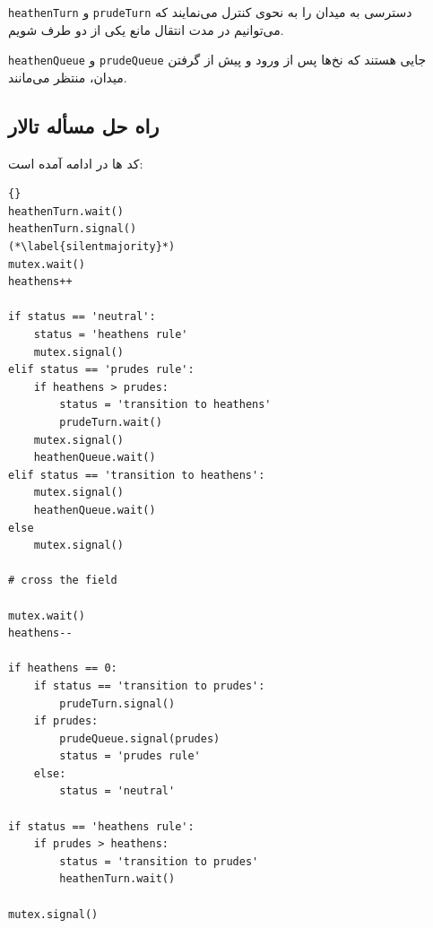\documentclass{book}
\newcommand{\clearemptydoublepage}{\newpage\cleardoublepage}
\begin{document}
    {\tt heathenTurn} و {\tt prudeTurn} 
    دسترسی به میدان را به نحوی کنترل می‌نمایند که می‌توانیم در مدت انتقال مانع یکی از دو طرف شویم. 

    {\tt heathenQueue} و {\tt prudeQueue}
    جایی هستند که نخ‌ها پس از ورود و پیش از گرفتن میدان، منتظر می‌مانند. 
    

\clearemptydoublepage
\subsection{راه حل مسأله تالار  }

    کد ها در ادامه آمده است:‌ 

\begin{latin}
\begin{lstlisting}[title=\rl{راه حل مسأله  \lr{Modus} }]{}
heathenTurn.wait()
heathenTurn.signal()
(*\label{silentmajority}*)
mutex.wait()
heathens++

if status == 'neutral':
    status = 'heathens rule'
    mutex.signal()
elif status == 'prudes rule':
    if heathens > prudes:
        status = 'transition to heathens'
        prudeTurn.wait()
    mutex.signal()
    heathenQueue.wait()
elif status == 'transition to heathens':
    mutex.signal()
    heathenQueue.wait()
else
    mutex.signal()

# cross the field

mutex.wait()
heathens--

if heathens == 0:
    if status == 'transition to prudes':
        prudeTurn.signal()
    if prudes:
        prudeQueue.signal(prudes)
        status = 'prudes rule'
    else:
        status = 'neutral'
        
if status == 'heathens rule':
    if prudes > heathens:
        status = 'transition to prudes'
        heathenTurn.wait()

mutex.signal()
\end{lstlisting}
\end{latin}
\end{document}
